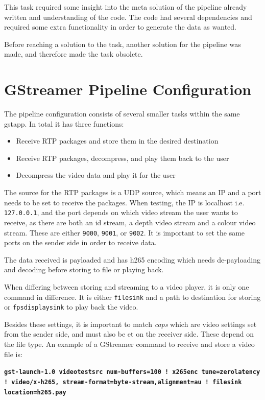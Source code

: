 This task required some insight into the meta solution of the pipeline already written and understanding of the code. The code had several dependencies and required some extra functionality in order to generate the data as wanted.

Before reaching a solution to the task, another solution for the pipeline was made, and therefore made the task obsolete.

\section{GStreamer Pipeline Configuration}\label{sec:gstream_design}
The pipeline configuration consists of several smaller tasks within the same \gls{gstapp}. In total it has three functions:

\begin{itemize}
	\item Receive RTP packages and store them in the desired destination
	\item Receive RTP packages, decompress, and play them back to the user
	\item Decompress the video data and play it for the user
\end{itemize}

The source for the RTP packages is a UDP source, which means an IP and a port needs to be set to receive the packages. When testing, the IP is localhost i.e. \lstinline|127.0.0.1|, and the port depends on which video stream the user wants to receive, as there are both an id stream, a depth video stream and a colour video stream. These are either \lstinline|9000|, \lstinline|9001|, or \lstinline|9002|. It is important to set the same ports on the sender side in order to receive data.

The data received is payloaded and has h265 encoding which needs de-payloading and decoding before storing to file or playing back. 

When differing between storing and streaming to a video player, it is only one command in difference. It is either \lstinline|filesink| and a path to destination for storing or \lstinline|fpsdisplaysink| to play back the video.

Besides these settings, it is important to match \textit{caps} which are video settings set from the sender side, and must also be et on the receiver side. These depend on the file type. An example of a GStreamer command to receive and store a video file is:

\noindent\textbf{\lstinline|gst-launch-1.0 videotestsrc num-buffers=100 ! x265enc tune=zerolatency ! video/x-h265, stream-format=byte-stream,alignment=au ! filesink location=h265.pay|}


